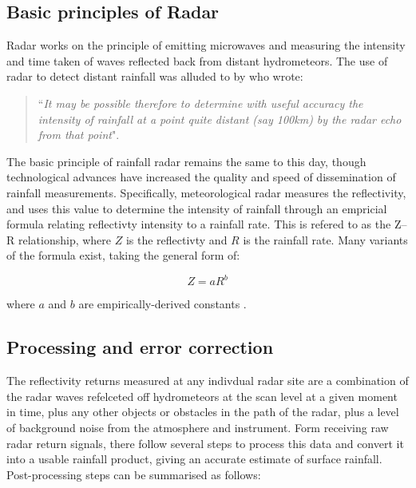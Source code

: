 \subsection{Basic principles of Radar}

Radar works on the principle of emitting microwaves and measuring the intensity and time taken of waves reflected back from distant hydrometeors. The use of radar to detect distant rainfall was alluded to by \citet{marshall1947measurement} who wrote: 

\begin{quotation} 
``\textit{It may be possible therefore to determine with useful accuracy the intensity of rainfall at a point quite distant (say 100km) by the radar echo from that point}".
\end{quotation}

The basic principle of rainfall radar remains the same to this day, though technological advances have increased the quality and speed of dissemination of rainfall measurements. Specifically, meteorological radar measures the reflectivity, and uses this value to determine the intensity of rainfall through an empricial formula relating reflectivty intensity to a rainfall rate. This is refered to as the Z--R relationship, where \(Z\) is the reflectivty and \(R\) is the rainfall rate. Many variants of the formula exist, taking the general form of:
  
\begin{equation}
Z = aR^b
\end{equation}

\noindent
where \(a\) and \(b\) are empirically-derived constants \citep{gunn1949terminal,joss1969raindrop}.

\subsection{Processing and error correction}

The reflectivity returns measured at any indivdual radar site are a combination of the radar waves refelceted off hydrometeors at the scan level at a given moment in time, plus any other objects or obstacles in the path of the radar, plus a level of background noise from the atmosphere and instrument. Form receiving raw radar return signals, there follow several steps to process this data and convert it into a usable rainfall product, giving an accurate estimate of surface rainfall. Post-processing steps can be summarised as follows:

